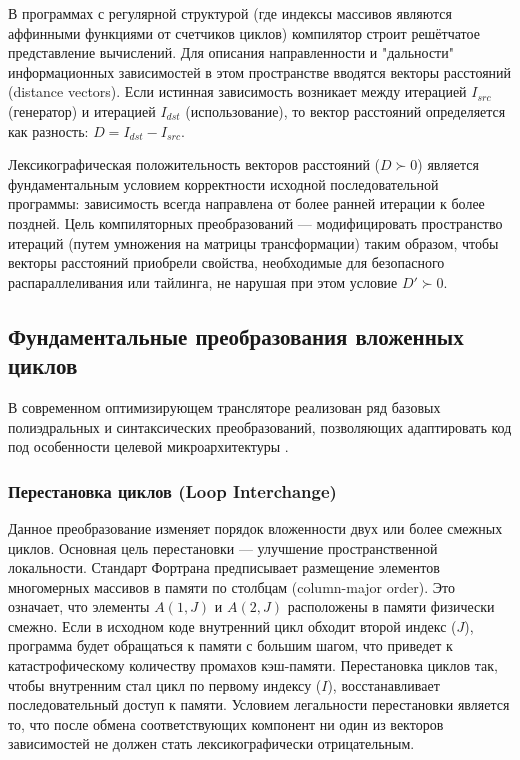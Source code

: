 \documentclass[14pt, russian]{scrartcl}
\begin{document}
В программах с регулярной структурой (где индексы массивов являются аффинными функциями от счетчиков циклов) компилятор строит решётчатое представление вычислений. Для описания направленности и "дальности" информационных зависимостей в этом пространстве вводятся векторы расстояний (distance vectors). Если истинная зависимость возникает между итерацией $I_{src}$ (генератор) и итерацией $I_{dst}$ (использование), то вектор расстояний определяется как разность: $D = I_{dst} - I_{src}$. 

Лексикографическая положительность векторов расстояний ($D \succ 0$) является фундаментальным условием корректности исходной последовательной программы: зависимость всегда направлена от более ранней итерации к более поздней. Цель компиляторных преобразований --- модифицировать пространство итераций (путем умножения на матрицы трансформации) таким образом, чтобы векторы расстояний приобрели свойства, необходимые для безопасного распараллеливания или тайлинга, не нарушая при этом условие $D' \succ 0$.

\subsection{Фундаментальные преобразования вложенных циклов}

В современном оптимизирующем трансляторе реализован ряд базовых полиэдральных и синтаксических преобразований, позволяющих адаптировать код под особенности целевой микроархитектуры \cite{allenKennedy2002}.

\subsubsection{Перестановка циклов (Loop Interchange)}
Данное преобразование изменяет порядок вложенности двух или более смежных циклов. Основная цель перестановки --- улучшение пространственной локальности. Стандарт Фортрана предписывает размещение элементов многомерных массивов в памяти по столбцам (column-major order). Это означает, что элементы $A(1, J)$ и $A(2, J)$ расположены в памяти физически смежно. Если в исходном коде внутренний цикл обходит второй индекс ($J$), программа будет обращаться к памяти с большим шагом, что приведет к катастрофическому количеству промахов кэш-памяти. Перестановка циклов так, чтобы внутренним стал цикл по первому индексу ($I$), восстанавливает последовательный доступ к памяти. Условием легальности перестановки является то, что после обмена соответствующих компонент ни один из векторов зависимостей не должен стать лексикографически отрицательным.
\end{document}
